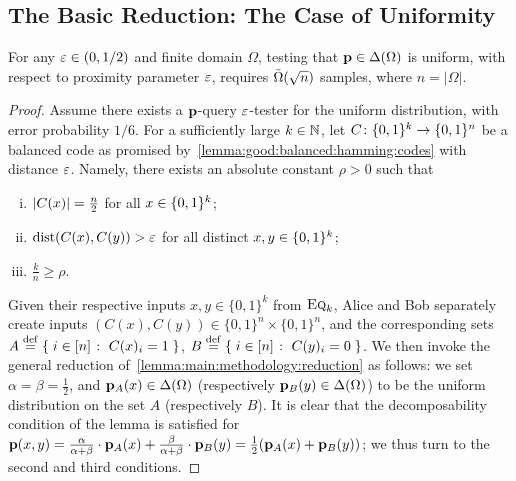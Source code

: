 \subsection{The Basic Reduction: The Case of Uniformity}\label{sec:uniformity}
\begin{theorem}
\label{theo:uniformity:lb}
For any $\eps\in(0,1/2)$ and finite domain $\Omega$, testing that $\p\in \distribs{\Omega}$ is uniform, with respect to proximity parameter $\eps$, requires $\tildeOmega{\sqrt{n}}$ samples, where $n = |\Omega|$.
\end{theorem}
\begin{proof}
Assume there exists a $\q$-query $\eps$-tester for the uniform distribution, with error probability $1/6$. For a sufficiently large $k\in\N$, let $C\colon \bitset^k \to \bitset^n$ be a balanced code as promised by~\cref{lemma:good:balanced:hamming:codes} with distance $\eps$. Namely, there exists an absolute constant $\rho > 0$ such that
\begin{enumerate}[(i)]
  \item $\abs{C(x)} = \frac{n}{2}$ for all $x\in \bitset^k$;
  \item $\dist{C(x)}{C(y)} > \eps$ for all distinct $x,y\in \bitset^k$;
  \item $\frac{k}{n} \geq \rho$.
\end{enumerate}
Given their respective inputs $x,y\in\{0,1\}^k$ from $\EQ[k]$, Alice and Bob separately create inputs $(C(x),C(y))\in\{0,1\}^n\times\{0,1\}^n$, and the corresponding sets $A\eqdef \setOfSuchThat{ i\in[n] }{ C(x)_i=1 }$, $B\eqdef \setOfSuchThat{ i\in[n] }{ C(y)_i =0 }$. We then invoke the general reduction of~\cref{lemma:main:methodology:reduction} as follows: we set $\alpha=\beta=\frac{1}{2}$, and $\p_A(x)\in\distribs{\domain}$ (respectively $\p_B(y)\in\distribs{\domain}$) to be the uniform distribution on the set $A$ (respectively $B$). It is clear that the decomposability condition of the lemma is satisfied for $\p(x,y) = \frac{\alpha}{\alpha+\beta} \cdot \p_A(x)+\frac{\beta}{\alpha+\beta} \cdot \p_B(y) = \frac{1}{2}(\p_A(x)+\p_B(y))$; we thus turn to the second and third conditions.


\end{proof}
